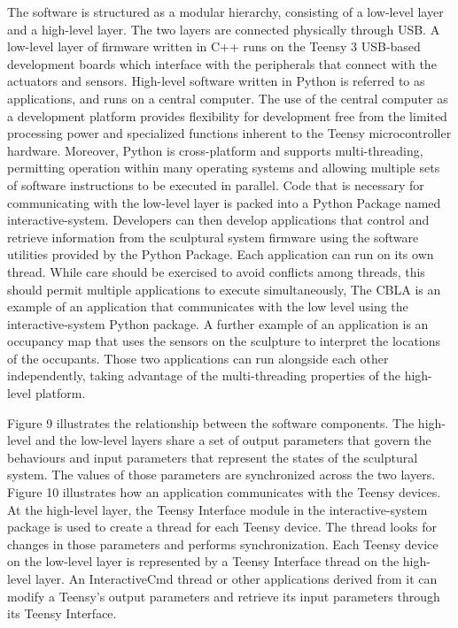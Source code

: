 The software is structured as a modular hierarchy, consisting of a low-level layer and a high-level layer. The two layers are connected physically through USB. A low-level layer of firmware written in C++ runs on the Teensy 3 USB-based development boards which interface with the peripherals that connect with the actuators and sensors.  High-level software written in Python is referred to as applications, and runs on a central computer. The use of the central computer as a development platform provides flexibility for development free from the limited processing power and specialized functions inherent to the Teensy microcontroller hardware. Moreover, Python is cross-platform and supports multi-threading, permitting operation within many operating systems and allowing multiple sets of software instructions to be executed in parallel. Code that is necessary for communicating with the low-level layer is packed into a Python Package named interactive-system. Developers can then develop applications that control and retrieve information from the sculptural system firmware using the software utilities provided by the Python Package. Each application can run on its own thread. While care should be exercised to avoid conflicts among threads, this should permit multiple applications to execute simultaneously, 	
The CBLA is an example of an application that communicates with the low level using the interactive-system Python package. A further example of an application is an occupancy map that uses the sensors on the sculpture to interpret the locations of the occupants. Those two applications can run alongside each other independently, taking advantage of the multi-threading properties of the high-level platform.

Figure 9 illustrates the relationship between the software components. The high-level and the low-level layers share a set of output parameters that govern the behaviours and input parameters that represent the states of the sculptural system. The values of those parameters are synchronized across the two layers. Figure 10 illustrates how an application communicates with the Teensy devices. At the high-level layer, the Teensy Interface module in the interactive-system package is used to create a thread for each Teensy device. The thread looks for changes in those parameters and performs synchronization. Each Teensy device on the low-level layer is represented by a Teensy Interface thread on the high-level layer. An InteractiveCmd thread or other applications derived from it can modify a Teensy’s output parameters and retrieve its input parameters through its Teensy Interface.

